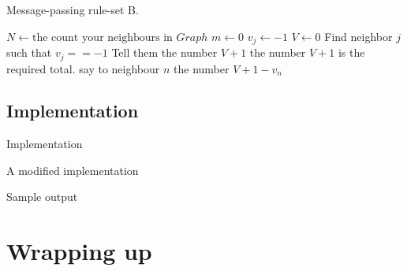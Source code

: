 \documentclass[pdflatex,colorlinks,landscape]{beamer}
\begin{document}
\begin{frame}[allowframebreaks]{Message-passing rule-set B.}
  \begin{algorithmic}[1]
      \State $N \gets \text{the count your neighbours in $Graph$}$
      \State $m\gets 0$ 
        \State $v_j\gets -1$ 
      \EndFor
      \State $V\gets 0$ 
        \State Find neighbor $j$ such that $v_j==-1$
        \State Tell them the number $V + 1$
      \EndIf
      \newpage
        \State the number $V + 1$ is the required total.
          \State say to neighbour $n$ the number $V + 1 - v_n$
        \EndFor
      \EndIf
    \EndProcedure
  \end{algorithmic}
\end{frame}

\subsection{Implementation}

\begin{frame}[allowframebreaks]{Implementation}
  \begin{small}
    
  \end{small}
\end{frame}

\begin{frame}[allowframebreaks]{A modified implementation}
  \begin{small}
    
  \end{small}
\end{frame}

\begin{frame}[allowframebreaks]{Sample output}
  \begin{tiny}
  \end{tiny}
\end{frame}

\section{Wrapping up}
\end{document}
